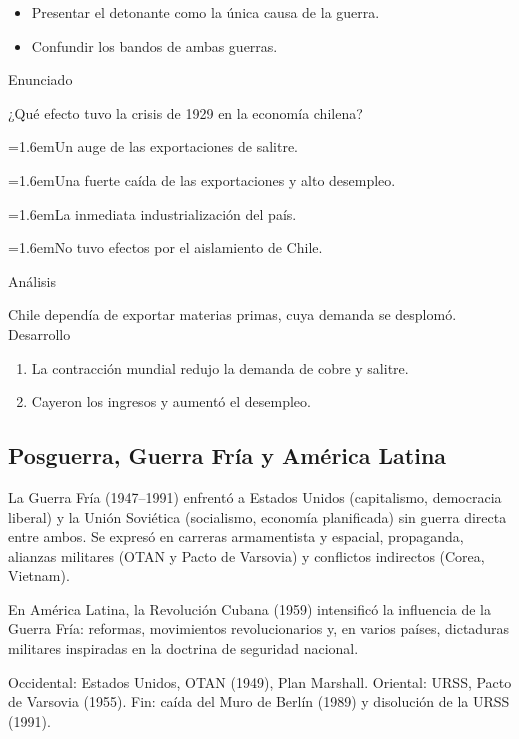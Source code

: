 \documentclass[10pt,a4paper,twocolumn]{article}
\newcommand{\alternativa}[2]{\par\noindent\hangindent=1.6em\hangafter=1\makebox[1.6em][l]{\tecla{#1}}#2\par}
\newcommand{\clave}[1]{\par\smallskip{\sffamily\footnotesize\color{esmeralda} Clave \teclaok{#1}}\par}
\begin{document}
\begin{errorfrecuente}
\begin{itemize}
  \item Presentar el detonante como la única causa de la guerra.
  \item Confundir los bandos de ambas guerras.
\end{itemize}
\end{errorfrecuente}

\begin{ejemplo}
{\sffamily\footnotesize\color{zinc500} Enunciado}\par
¿Qué efecto tuvo la crisis de 1929 en la economía chilena?
\alternativa{A}{Un auge de las exportaciones de salitre.}
\alternativa{B}{Una fuerte caída de las exportaciones y alto desempleo.}
\alternativa{C}{La inmediata industrialización del país.}
\alternativa{D}{No tuvo efectos por el aislamiento de Chile.}
\clave{B}
{\sffamily\footnotesize\color{zinc500} Análisis}\par Chile dependía de exportar materias primas, cuya demanda se desplomó.
{\sffamily\footnotesize\color{zinc500} Desarrollo}
\begin{enumerate}
  \item La contracción mundial redujo la demanda de cobre y salitre.
  \item Cayeron los ingresos y aumentó el desempleo.
\end{enumerate}
\end{ejemplo}

\subsection{Posguerra, Guerra Fría y América Latina}

La Guerra Fría (1947–1991) enfrentó a Estados Unidos (capitalismo, democracia liberal) y la Unión Soviética (socialismo, economía planificada) sin guerra directa entre ambos. Se expresó en carreras armamentista y espacial, propaganda, alianzas militares (OTAN y Pacto de Varsovia) y conflictos indirectos (Corea, Vietnam).

En América Latina, la Revolución Cubana (1959) intensificó la influencia de la Guerra Fría: reformas, movimientos revolucionarios y, en varios países, dictaduras militares inspiradas en la doctrina de seguridad nacional.

\begin{definicion}[Bloques]
Occidental: Estados Unidos, OTAN (1949), Plan Marshall. Oriental: URSS, Pacto de Varsovia (1955). Fin: caída del Muro de Berlín (1989) y disolución de la URSS (1991).
\end{definicion}
\end{document}
